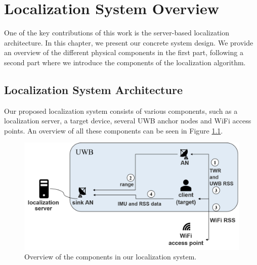 
\chapter{Localization System Overview} %

\label{Chapter3} %
One of the key contributions of this work is the server-based localization architecture. In this chapter, we present our concrete system design. We provide an overview of the different physical components in the first part, following a second part where we introduce the components of the localization algorithm. 


\section{Localization System Architecture}
Our proposed localization system consists of various components, such as a localization server, a target device, several UWB anchor nodes and WiFi access points. An overview of all these components can be seen in Figure \ref{fig:system_components}.\\
\begin{figure}[th]
\centering
\includegraphics[width=1.0\textwidth]{Figures/system_components_numbers}
\decoRule
\caption[System Architecture]{Overview of the components in our localization system.}
\label{fig:system_components}
\end{figure}

